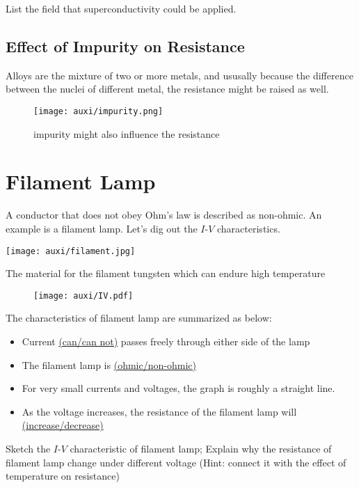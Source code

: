 \documentclass[a4paper]{tufte-handout}
\newenvironment{TaskBox} %
{\begin{tcolorbox}[breakable,colback=b1!30,colframe=b1,title=Task]} {\end{tcolorbox}}
\newenvironment{SummBox}
{\begin{tcolorbox}[breakable,colback=r1!30,colframe=r1,title=Summary]} {\end{tcolorbox}}
\begin{document}
\begin{TaskBox}
List the field that superconductivity could be applied.
\vspace{1in}
\end{TaskBox}

\subsection{Effect of Impurity on Resistance}
Alloys are the mixture of two or more metals, and ususally because the difference between the nuclei of different metal, the resistance might be raised as well. 
\begin{figure}[h]
\centering
\texttt{[image: auxi/impurity.png]}
\caption{impurity might also influence the resistance}
\end{figure}

\section{Filament Lamp}
A conductor that does not obey Ohm’s law is described as non-ohmic. An example is a filament lamp. Let's dig out the $I$-$V$ characteristics. 
\begin{marginfigure}
\texttt{[image: auxi/filament.jpg]}
\caption{The material for the filament tungsten which can endure high temperature}
\end{marginfigure}

\begin{figure}[h]
\centering
\texttt{[image: auxi/IV.pdf]}
\end{figure}

The characteristics of filament lamp are summarized as below:
\begin{SummBox}
\begin{itemize}
  \item Current \uline{(can/can not)} passes freely through either side of the lamp
  \item The filament lamp is \uline{(ohmic/non-ohmic)}
  \item For very small currents and voltages, the graph is roughly a straight line.
  \item As the voltage increases, the resistance of the filament lamp will \uline{(increase/decrease)}
\end{itemize}
\end{SummBox}

\begin{TaskBox}
Sketch the $I$-$V$ characteristic of filament lamp;
\tcblower
Explain why the resistance of filament lamp change under different voltage (Hint: connect it with the effect of temperature on resistance)
\end{TaskBox}
\end{document}
